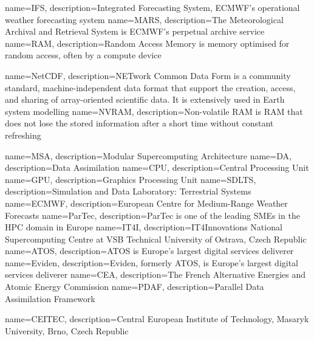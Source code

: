 {
    name=IFS,
    description={Integrated Forecasting System, ECMWF's operational weather forecasting system}
}
{
    name=MARS,
    description={The Meteorological Archival and Retrieval System is ECMWF's perpetual archive service}
}
{
    name=RAM,
    description={Random Access Memory  is memory optimised for random access, often by a compute device}
}

{
    name=NetCDF,
    description={NETwork Common Data Form is a community standard, machine-independent data format that support the creation, access, and sharing of array-oriented scientific data. It is extensively used in Earth system modelling}
}
{
    name=NVRAM,
    description={Non-volatile \Gls{RAM} is \Gls{RAM} that does not lose the stored information after a short time without constant refreshing}
}

{
    name=MSA,
    description={Modular Supercomputing Architecture}
}
{
    name=DA,
    description={Data Assimilation}
}
{
    name=CPU,
    description={Central Processing Unit}
}
{
    name=GPU,
    description={Graphics Processing Unit}
}
{
    name=SDLTS,
    description={Simulation and Data Laboratory: Terrestrial Systems}
}
{
    name=ECMWF,
    description={European Centre for Medium-Range Weather Forecasts}
}
{
    name=ParTec,
    description={ParTec is one of the leading SMEs in the HPC domain in Europe}
}
{
    name=IT4I,
    description={IT4Innovations National Supercomputing Centre at VSB Technical University of Ostrava, Czech Republic}
}
{
    name=ATOS,
    description={ATOS is Europe's largest digital services deliverer}
}
{
    name=Eviden,
    description={Eviden, formerly ATOS, is Europe's largest digital services deliverer}
}
{
    name=CEA,
    description={The French Alternative Energies and Atomic Energy Commission}
}
{
    name=PDAF,
    description={Parallel Data Assimilation Framework}
}

{
    name=CEITEC,
    description={Central European Institute of Technology, Masaryk University, Brno, Czech Republic}
}


